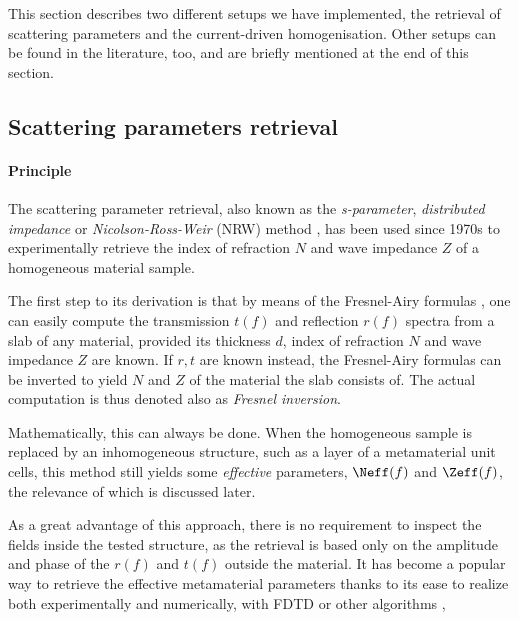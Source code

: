 This section describes two different setups we have implemented, the retrieval of scattering parameters and the current-driven homogenisation. Other setups can be found in the literature, too, and are briefly mentioned at the end of this section.
\subsection{Scattering parameters retrieval} \label{chapter_sparam}
\paragraph{Principle} %
The scattering parameter retrieval, also known as the \textit{s-parameter}, \textit{distributed impedance} or \textit{Nicolson-Ross-Weir} (NRW) method \cite{nicolson1970measurement, weir1974automatic}, has been used since 1970s to experimentally retrieve the index of refraction $N$ and wave impedance $Z$ of a homogeneous material sample.

The first step to its derivation is that by means of the Fresnel-Airy formulas \cite[p. 329]{born1999book},
one can easily compute the transmission $t(f)$ and reflection $r(f)$ spectra from a slab of any material, provided its thickness $d$, index of refraction $N$ and wave impedance $Z$ are known.  If $r,t$ are known instead, the Fresnel-Airy formulas can be inverted to yield $N$ and $Z$ of the material the slab consists of. The actual computation is thus denoted also as \textit{Fresnel inversion}.

Mathematically, this can always be done. When the homogeneous sample is replaced by an inhomogeneous structure, such as a layer of a metamaterial unit cells, this method still yields some \textit{effective} parameters, $\Neff(f)$ and $\Zeff(f)$, the relevance of which is discussed later. 

As a great advantage of this approach, there is no requirement to inspect the fields inside the tested structure, as the retrieval is based only on the amplitude and phase of the  $r(f)$ and $t(f)$ outside the material. It has become a popular way to retrieve the effective metamaterial parameters thanks to its ease to realize both experimentally and numerically, with FDTD or other algorithms \cite{terao2011},

